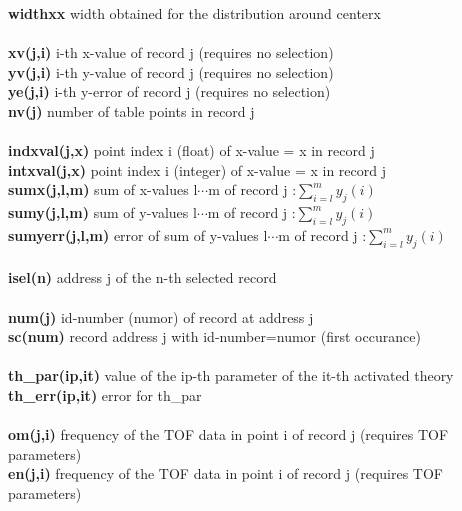 \documentclass[11pt,fleqn]{book} %
\begin{document}
\begin{tabbing}
\textbf{widthxx } \>  width obtained for the distribution around centerx \\  
\\
\textbf{xv(j,i)  } \>  i-th x-value of record j  (requires no selection)            \\         
\textbf{yv(j,i)  } \>  i-th y-value of record j  (requires no selection)            \\         
\textbf{ye(j,i)  } \>  i-th y-error of record j  (requires no selection)            \\ 
\textbf{nv(j)    } \>  number of table points in record j                           \\ 
\\
\textbf{indxval(j,x)}   \>  point index i (float) of x-value = x in record j        \\ 
\textbf{intxval(j,x)}   \>  point index i (integer) of x-value = x in record j      \\ 
\textbf{sumx(j,l,m)}    \>  sum of x-values l$\cdots$m of record j :${\sum_{i=l}^{m} y_j(i)}$ \\ 
\textbf{sumy(j,l,m)}    \>  sum of y-values l$\cdots$m of record j :${\sum_{i=l}^{m} y_j(i)}$ \\ 
\textbf{sumyerr(j,l,m)} \>  error of sum of y-values l$\cdots$m of record j :${\sum_{i=l}^{m} y_j(i)}$ \\ 
\\
\textbf{isel(n)  } \>  address j of the n-th selected record \\ 
\\
\textbf{num(j) } \>  id-number (numor) of record at address j                       \\ 
\textbf{sc(num)} \>  record address j with id-number=numor (first occurance)           \\ 
 \\
\textbf{th\_par(ip,it)}  \>  value of the ip-th parameter of the it-th activated theory    \\ 
\textbf{th\_err(ip,it)}  \>  error for th\_par    \\ 
  \\
\textbf{om(j,i)}  \>  frequency of the TOF data in point i of record j (requires TOF parameters)   \\ 
\textbf{en(j,i)}  \>  frequency of the TOF data in point i of record j (requires TOF parameters)    \\ 
        
\end{tabbing}
\color{black}
\end{document}
